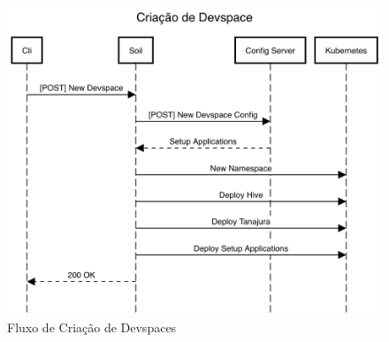     	\begin{figure}[htbp]
			\caption{\label{fig_create_devspace}Fluxo de Criação de Devspaces}
			\begin{center}
			\includegraphics[scale=0.40]{pictures/create-devspace.png}
			\end{center}
		\end{figure}